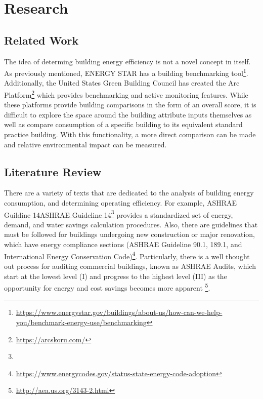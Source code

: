 \section{Research}
\label{sec:literature_review}

\subsection{Related Work}
The idea of determing building energy efficiency is not a novel concept in itself.  As previously mentioned, ENERGY STAR has a building benchmarking tool\footnote{\href{https://www.energystar.gov/buildings/about-us/how-can-we-help-you/benchmark-energy-use/benchmarking }{\url{https://www.energystar.gov/buildings/about-us/how-can-we-help-you/benchmark-energy-use/benchmarking}}}.  Additionally, the United States Green Building Council has created the Arc Platform\footnote{\href{https://arcskoru.com/}{\url{https://arcskoru.com/}}} which provides benchmarking and active monitoring features.  While these platforms provide building comparisons in the form of an overall score, it is difficult to explore the space around the building attribute inputs themselves as well as compare consumption of a specific building to its equivalent standard practice building.  With this functionality, a more direct comparison can be made and relative environmental impact can be measured.

\subsection{Literature Review}

There are a variety of texts that are dedicated to the analysis of building energy consumption, and determining operating efficiency.  For example, ASHRAE Guildine 14\href{https://www.techstreet.com/standards/guideline-14-2014-measurement-of-energy-demand-and-water-savings?product_id=1888937}{ASHRAE Guideline 14}\footnote{} provides a standardized set of energy, demand, and water savings calculation procedures.  Also, there are guidelines that must be followed for buildings undergoing new construction or major renovation, which have energy compliance sections (ASHRAE Guideline 90.1, 189.1, and International Energy Conservation Code)\footnote{\href{https://www.energycodes.gov/status-state-energy-code-adoption}{\url{https://www.energycodes.gov/status-state-energy-code-adoption}}}.  Particularly, there is a well thought out process for auditing commercial buildings, known as ASHRAE Audits, which start at the lowest level (I) and progress to the highest level (III) as the opportunity for energy and cost savings becomes more apparent \footnote{\href{http://aea.us.org/3143-2.html}{\url{http://aea.us.org/3143-2.html}}}.  